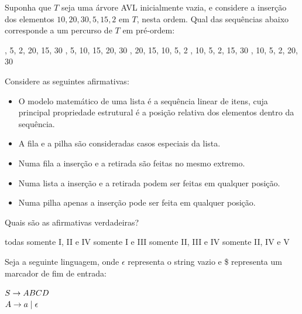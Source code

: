 \documentclass[12pt, addpoints]{exam}
\begin{document}
\begin{questions}
\question

Suponha que \( T \) seja uma árvore AVL inicialmente vazia, e considere a inserção dos elementos \(10, 20, 30, 5, 15, 2\) em \( T \), nesta ordem. Qual das sequências abaixo corresponde a um percurso de \( T \) em pré-ordem:
\begin{choices}
, 5, 2, 20, 15, 30
, 5, 10, 15, 20, 30
, 20, 15, 10, 5, 2
, 10, 5, 2, 15, 30
, 10, 5, 2, 20, 30
\end{choices}

\question

Considere as seguintes afirmativas:

\begin{itemize}

    \item O modelo matemático de uma lista é a sequência linear de itens, cuja principal propriedade estrutural é a posição relativa dos elementos dentro da sequência.

    \item A fila e a pilha são consideradas casos especiais da lista.

    \item Numa fila a inserção e a retirada são feitas no mesmo extremo.

    \item Numa lista a inserção e a retirada podem ser feitas em qualquer posição.

    \item Numa pilha apenas a inserção pode ser feita em qualquer posição.

\end{itemize}



Quais são as afirmativas verdadeiras?
\begin{choices}
\choice todas
\choice somente I, II e IV
\choice somente I e III
\choice somente II, III e IV
\choice somente II, IV e V
\end{choices}

\question

Seja a seguinte linguagem, onde \(\epsilon\) representa o string vazio e \$ representa um marcador de fim de entrada:



$S \rightarrow ABCD \\$\\

$A \rightarrow a \mid \epsilon \\$\\


\end{questions}
\end{document}
